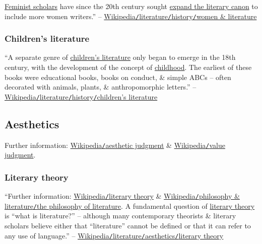 \documentclass[oneside]{book}
\numberwithin{equation}{section}
\begin{document}
\href{https://en.wikipedia.org/wiki/Feminism}{Feminist scholars} have since the 20th century sought \href{https://en.wikipedia.org/wiki/Women%27s_writing_(literary_category)#Rediscovering_ignored_works_from_the_past}{expand the literary canon} to include more women writers.'' -- \href{https://en.wikipedia.org/wiki/Literature#Women_and_literature}{Wikipedia\texttt{/}literature\texttt{/}history\texttt{/}women \& literature}

\subsubsection{Children's literature}
``A separate genre of \href{https://en.wikipedia.org/wiki/Children%27s_literature}{children's literature} only began to emerge in the 18th century, with the development of the concept of \href{https://en.wikipedia.org/wiki/Childhood}{childhood}. The earliest of these books were educational books, books on conduct, \& simple ABCs -- often decorated with animals, plants, \& anthropomorphic letters.'' -- \href{https://en.wikipedia.org/wiki/Literature#Children's_literature}{Wikipedia\texttt{/}literature\texttt{/}history\texttt{/}children's literature}

\subsection{Aesthetics}
Further information: \href{https://en.wikipedia.org/wiki/Aesthetic_judgment}{Wikipedia\texttt{/}aesthetic judgment} \& \href{https://en.wikipedia.org/wiki/Value_judgment}{Wikipedia\texttt{/}value judgment}.

\subsubsection{Literary theory}
``Further information: \href{https://en.wikipedia.org/wiki/Literary_theory}{Wikipedia\texttt{/}literary theory} \& \href{https://en.wikipedia.org/wiki/Philosophy_and_literature#The_philosophy_of_literature}{Wikipedia\texttt{/}philosophy \& literature\texttt{/}the philosophy of literature}. A fundamental question of \href{https://en.wikipedia.org/wiki/Literary_theory}{literary theory} is ``what is literature?'' -- although many contemporary theorists \& literary scholars believe either that ``literature'' cannot be defined or that it can refer to any use of language.'' -- \href{https://en.wikipedia.org/wiki/Literature#Literary_theory}{Wikipedia\texttt{/}literature\texttt{/}aesthetics\texttt{/}literary theory}
\end{document}
